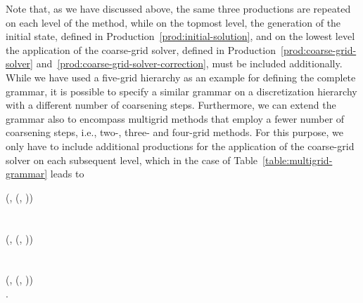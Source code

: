 Note that, as we have discussed above, the same three productions are repeated on each level of the method, while on the topmost level, the generation of the initial state, defined in Production~\eqref{prod:initial-solution}, and on the lowest level the application of the coarse-grid solver, defined in Production~\eqref{prod:coarse-grid-solver} and~\eqref{prod:coarse-grid-solver-correction}, must be included additionally.
While we have used a five-grid hierarchy as an example for defining the complete grammar, it is possible to specify a similar grammar on a discretization hierarchy with a different number of coarsening steps.
Furthermore, we can extend the grammar also to encompass multigrid methods that employ a fewer number of coarsening steps, i.e., two-, three- and four-grid methods.
For this purpose, we only have to include additional productions for the application of the coarse-grid solver on each subsequent level, which in the case of Table~\ref{table:multigrid-grammar} leads to
\begin{bnf*}
	 {
		(, \bnfsp {}(, \bnfsp{}))
	} \\
	 \\ \\
	 {
		(, \bnfsp {}(, \bnfsp{}))
	} \\
	 \\ \\
	 {
		(, \bnfsp {}(, \bnfsp{}))
	} \\
	.
\end{bnf*}
